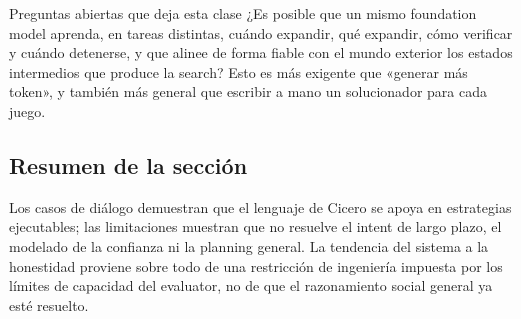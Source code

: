 

\begin{importantbox}{Preguntas abiertas que deja esta clase}
¿Es posible que un mismo foundation model aprenda, en tareas distintas, cuándo expandir, qué expandir, cómo verificar y cuándo detenerse, y que alinee de forma fiable con el mundo exterior los estados intermedios que produce la search? Esto es más exigente que «generar más token», y también más general que escribir a mano un solucionador para cada juego.
\end{importantbox}

\subsection{Resumen de la sección}

Los casos de diálogo demuestran que el lenguaje de Cicero se apoya en estrategias ejecutables; las limitaciones muestran que no resuelve el intent de largo plazo, el modelado de la confianza ni la planning general. La tendencia del sistema a la honestidad proviene sobre todo de una restricción de ingeniería impuesta por los límites de capacidad del evaluator, no de que el razonamiento social general ya esté resuelto.
